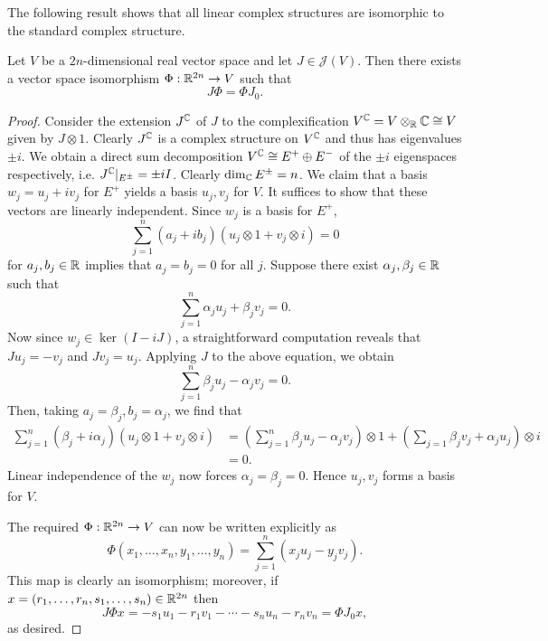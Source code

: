\documentclass{amsart}
\begin{document}
The following result shows that all linear complex structures are isomorphic to the
standard complex structure.

\begin{proposition}
    Let $V$ be a $2n$-dimensional real vector space and let $J\in\mathcal{J}(V)$. Then
    there exists a vector space isomorphism $\Phi:\mathbb{R}^{2n}\to V$ such that
    \begin{equation*}
        J\Phi = \Phi J_0.
    \end{equation*}
    \label{lem:complex_iso}
\end{proposition}
\begin{proof}
    Consider the extension $J^{\mathbb{C}}$ of $J$ to the complexification $V^{\mathbb{C}}=V\otimes_{\mathbb{R}}\mathbb{C}\cong V$
    given by $J\otimes1$. Clearly $J^{\mathbb{C}}$ is a complex structure on $V^{\mathbb{C}}$ and thus has
    eigenvalues $\pm i$. We obtain a direct sum decomposition $V^{\mathbb{C}}\cong E^+\oplus E^-$
    of the $\pm i$ eigenspaces respectively, i.e. $J^{\mathbb{C}}|_{E^\pm}=\pm iI$. Clearly $\dim_{\mathbb{C}} E^{\pm}=n$.
    We claim that a basis $w_j=u_j+iv_j$ for $E^+$ yields a basis $u_j,v_j$ for $V$.
    It suffices to show that these vectors are linearly independent. Since $w_j$ is a basis
    for $E^+$,
    \begin{equation*}
        \sum_{j=1}^n (a_j+ib_j)(u_j\otimes 1+v_j\otimes i) = 0
    \end{equation*}
    for $a_j,b_j\in\mathbb{R}$ implies that $a_j=b_j=0$ for all $j$. Suppose there exist $\alpha_j,\beta_j\in\mathbb{R}$
    such that
    \begin{equation*}
        \sum_{j=1}^n \alpha_ju_j+\beta_jv_j=0.
    \end{equation*}
    Now since $w_j\in\ker(I-iJ)$, a straightforward computation reveals that $Ju_j=-v_j$ and $Jv_j=u_j$.
    Applying $J$ to the above equation, we obtain
    \begin{equation*}
        \sum_{j=1}^n \beta_j u_j - \alpha_j v_j = 0.
    \end{equation*}
    Then, taking $a_j=\beta_j,b_j=\alpha_j$, we find that
    \begin{align*}
        \sum_{j=1}^n(\beta_j+i\alpha_j)(u_j\otimes 1+v_j\otimes i) &= \left( \sum_{j=1}^n\beta_ju_j-\alpha_jv_j \right)\otimes 1
        + \left( \sum_{j=1}\beta_jv_j+\alpha_ju_j \right)\otimes i\\
        &=0.
    \end{align*}
    Linear independence of the $w_j$ now forces $\alpha_j=\beta_j=0$. Hence $u_j,v_j$ forms a basis
    for $V$.

    The required $\Phi:\mathbb{R}^{2n}\to V$ can now be written explicitly as
    \begin{equation*}
        \Phi(x_1,\ldots,x_n,y_1,\ldots,y_n) = \sum_{j=1}^n\left( x_ju_j-y_jv_j \right).
    \end{equation*}
    This map is clearly an isomorphism; moreover, if $x=(r_1,\ldots,r_n,s_1,\ldots,s_n)\in\mathbb{R}^{2n}$
    then
    \begin{equation*}
        J\Phi x = -s_1u_1-r_1v_1-\cdots-s_nu_n-r_nv_n = \Phi J_0x,
    \end{equation*}
    as desired.
\end{proof}
\end{document}
